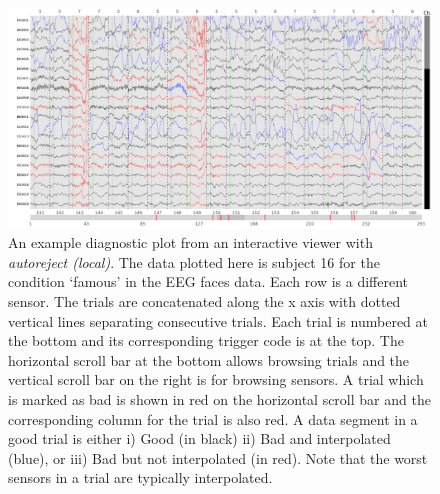 \clearpage
\begin{figure}
	\centering
	\includegraphics[width=\textwidth]{figures/figure8.pdf}
    \caption{An example diagnostic plot from an interactive viewer with \emph{autoreject (local)}. The data plotted here is subject 16 for the condition `famous' in the EEG faces data. Each row is a different sensor. The trials are concatenated along the x axis with dotted vertical lines separating consecutive trials. Each trial is numbered at the bottom and its corresponding trigger code is at the top. The horizontal scroll bar at the bottom allows browsing trials and the vertical scroll bar on the right is for browsing sensors. A trial which is marked as bad is shown in red on the horizontal scroll bar and the corresponding column for the trial is also red. A data segment in a good trial is either i) Good (in black) ii) Bad and interpolated (blue), or iii) Bad but not interpolated (in red). Note that the worst sensors in a trial are typically interpolated.}
    \label{fig:diagnostic_plot}
\end{figure}
\clearpage

%
%
%

%
%
%
%
%

%
%

%

%
%
%
%
%
%
%
%
%

%
%
%
%

%
%
%
%

%

%

%
%
%
%
%
%
%

%

%
%

%
%
%

%
